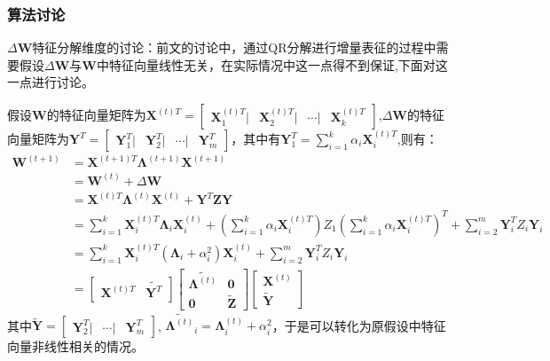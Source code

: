 \subsubsection{算法讨论}
\textbf{$\Delta\textbf{W}$}特征分解维度的讨论：前文的讨论中，通过QR分解进行增量表征的过程中需要假设$\Delta\textbf{W}$与$\textbf{W}$中特征向量线性无关，在实际情况中这一点得不到保证,下面对这一点进行讨论。

假设$\textbf{W}$的特征向量矩阵为$\textbf{X}^{(t)T}=\begin{bmatrix} \textbf{X}^{(t)T}_1 | & \textbf{X}^{(t)T}_2 | & \cdots | & \textbf{X}^{(t)T}_k \end{bmatrix}$,$\Delta\textbf{W}$的特征向量矩阵为$\textbf{Y}^{T}=\begin{bmatrix} \textbf{Y}^T_1 | & \textbf{Y}^T_2 | & \cdots | & \textbf{Y}^T_m \end{bmatrix}$，其中有$\textbf{Y}^T_1 = \sum_{i=1}^{k} \alpha_i \textbf{X}^{(t)T}_i $,则有：
\begin{equation}\label{time_t1}
\begin{aligned}
\textbf{W}^{(t+1)} &= \textbf{X}^{(t+1)T} \bm{\Lambda}^{(t+1)} \textbf{X} ^{(t+1)} \\
&= \textbf{W}^{(t)} + \Delta \textbf{W} \\
&= \textbf{X}^{(t)T} \bm{\Lambda}^{(t)} \textbf{X} ^{(t)} +  \textbf{Y}^{T} \textbf{Z}  \textbf{Y} \\
&= \sum_{i=1}^{k}\textbf{X}^{(t)T}_i \bm{\Lambda}_i  \textbf{X}^{(t)}_i + (\sum_{i=1}^{k} \alpha_i \textbf{X}^{(t)T}_i) Z_1 (\sum_{i=1}^{k} \alpha_i \textbf{X}^{(t)T}_i)^T +\sum_{i=2}^{m}\textbf{Y}^{T}_i Z_i  \textbf{Y}_i \\
&= \sum_{i=1}^{k}\textbf{X}^{(t)T}_i (\bm{\Lambda}_i+\alpha_i^2)  \textbf{X}^{(t)}_i +
\sum_{i=2}^{m}\textbf{Y}^{T}_i Z_i  \textbf{Y}_i \\
&= \begin{bmatrix} \textbf{X}^{(t)T} & \tilde{\textbf{Y}^{T}}\end{bmatrix}
\begin{bmatrix}  \tilde{\bm{\Lambda}^{(t)}} & \textbf{0}\\
\textbf{0} & \tilde{\textbf{Z}}
\end{bmatrix}
\begin{bmatrix} \textbf{X}^{(t)} \\ \tilde{\textbf{Y}}\end{bmatrix}
\end{aligned}
\end{equation}
其中$\tilde{\textbf{Y}} =\begin{bmatrix}  \textbf{Y}^T_2 | & \cdots | & \textbf{Y}^T_m \end{bmatrix}$, $\tilde{\bm{\Lambda}^{(t)}}_i = \bm{\Lambda}^{(t)}_i+\alpha_i^2$，于是可以转化为原假设中特征向量非线性相关的情况。
